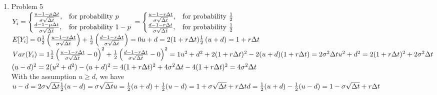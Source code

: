 \documentclass[a4paper]{article}
\def\dd{\Delta}
\def\lb{\left(}
\def\rb{\right)}
\begin{document}
\begin{enumerate}
\item Problem 5\\
\begin{math}
Y_i\\
=\begin{cases}\frac{u-1-\mu\dd t}{\sigma\sqrt{\dd t}}, &\mbox{for probability }p\\
\frac{d-1-\mu\dd t}{\sigma\sqrt{\dd t}}, &\mbox{for probability }1-p\end{cases}\\
=\begin{cases}\frac{u-1-r\dd t}{\sigma\sqrt{\dd t}}, &\mbox{for probability }\frac{1}{2}\\
\frac{d-1-r\dd t}{\sigma\sqrt{\dd t}}, &\mbox{for probability }\frac{1}{2}\end{cases}\\
\end{math}\\
\begin{math}
E[Y_i]=0\\
\frac{1}{2}\lb\frac{u-1-r\dd t}{\sigma\sqrt{\dd t}}\rb+\frac{1}{2}\lb\frac{d-1-r\dd t}{\sigma\sqrt{\dd t}}\rb=0\\
u+d=2(1+r\dd t)\\
\frac{1}{2}\lb u+d\rb=1+r\dd t\\
\end{math}\\
\begin{math}
Var(Y_i)=1\\
\frac{1}{2}\lb \frac{u-1-r\dd t}{\sigma\sqrt{\dd t}}-0\rb^2+\frac{1}{2}\lb \frac{d-1-r\dd t}{\sigma\sqrt{\dd t}}-0\rb^2=1\\
u^2+d^2+2(1+r\dd t)^2-2(u+d)(1+r\dd t)=2\sigma^2\dd t\\
u^2+d^2=2(1+r\dd t)^2+2\sigma^2\dd t\\
\end{math}\\
\begin{math}
(u-d)^2\\
=2(u^2+d^2)-(u+d)^2\\
=4(1+r\dd t)^2+4\sigma^2\dd t-4(1+r\dd t)^2\\
=4\sigma^2\dd t\\
\end{math}\\
With the assumption $u\geq d$, we have\\
\begin{math}
u-d=2\sigma\sqrt{\dd t}\\
\frac{1}{2}(u-d)=\sigma\sqrt{\dd t}\\
u=\frac{1}{2}(u+d)+\frac{1}{2}(u-d)=1+\sigma\sqrt{\dd t}+r\dd t\\
d=\frac{1}{2}(u+d)-\frac{1}{2}(u-d)=1-\sigma\sqrt{\dd t}+r\dd t\\
\end{math}\\
\pagebreak


\end{enumerate}
\end{document}
